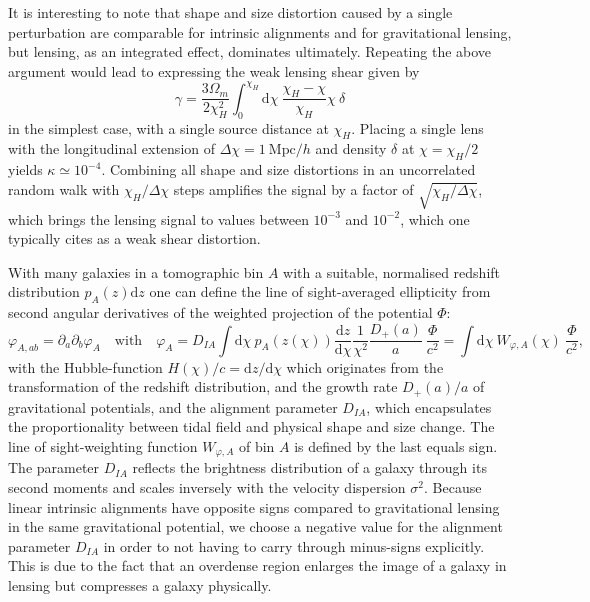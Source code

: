 \documentclass[a4paper,fleqn,usenatbib]{mnras}
\newcommand{\dd}{\mathrm{d}}
\begin{document}
It is interesting to note that shape and size distortion caused by a single perturbation are comparable for intrinsic alignments and for gravitational lensing, but lensing, as an integrated effect, dominates ultimately. Repeating the above argument would lead to expressing the weak lensing shear given by
\begin{equation}
\gamma = \frac{3\Omega_m}{2\chi_H^2}\int_0^{\chi_H}\mathrm{d}\chi\:\frac{\chi_H-\chi}{\chi_H}\chi\:\delta
\end{equation}
in the simplest case, with a single source distance at $\chi_H$. Placing a single lens with the longitudinal extension of $\Delta\chi = 1~\mathrm{Mpc}/h$ and density $\delta$ at $\chi = \chi_H/2$ yields $\kappa\simeq10^{-4}$. Combining all shape and size distortions in an uncorrelated random walk with $\chi_H/\Delta\chi$ steps amplifies the signal by a factor of $\sqrt{\chi_H/\Delta\chi}$, which brings the lensing  signal to values between $10^{-3}$ and $10^{-2}$, which one typically cites as a weak shear distortion.

With many galaxies in a tomographic bin $A$ with a suitable, normalised redshift distribution $p_A(z)\dd z$ one can define the line of sight-averaged ellipticity from second angular derivatives of the weighted projection of the potential $\Phi$:
\begin{equation}
\varphi_{A,ab} = \partial_a\partial_b\varphi_A
\quad\mathrm{with}\quad
\varphi_A = D_{IA}\int\dd\chi\:p_A(z(\chi))\frac{\dd z}{\dd\chi}\frac{1}{\chi^2}\frac{D_+(a)}{a}\:\frac{\Phi}{c^2} = \int\dd\chi\:W_{\varphi,A}(\chi)\:\frac{\Phi}{c^2},
\label{eqn_ia_los}
\end{equation}
with the Hubble-function $H(\chi)/c = \dd z/\dd\chi$ which originates from the transformation of the redshift distribution, and the growth rate $D_+(a)/a$ of gravitational potentials, and the alignment parameter $D_{IA}$, which encapsulates the proportionality between tidal field and physical shape and size change. The line of sight-weighting function $W_{\varphi,A}$ of bin $A$ is defined by the last equals sign. The parameter $D_{IA}$ reflects the brightness distribution of a galaxy through its second moments and scales inversely with the velocity dispersion $\sigma^2$. Because linear intrinsic alignments have opposite signs compared to gravitational lensing in the same gravitational potential, we choose a negative value for the alignment parameter $D_{IA}$ in order to not having to carry through minus-signs explicitly. This is due to the fact that an overdense region enlarges the image of a galaxy in lensing but compresses a galaxy physically.
\end{document}
